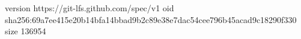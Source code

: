 version https://git-lfs.github.com/spec/v1
oid sha256:69a7ee415e20b14bfa14bbad9b2c89e38e7dac54cee796b45acad9c18290f330
size 136954
